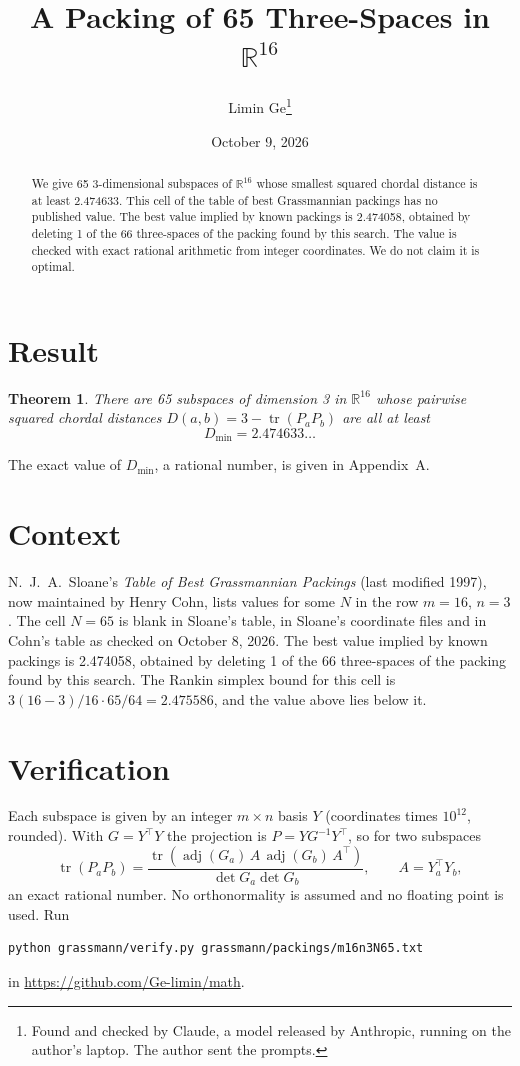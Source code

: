\documentclass[11pt,a4paper]{article}
\title{A Packing of 65 Three-Spaces in $\mathbb{R}^{16}$}
\author{Limin Ge\thanks{Found and checked by Claude, a model released by Anthropic, running on the author's laptop. The author sent the prompts.}}
\date{October 9, 2026}
\newtheorem*{theorem}{Theorem}
\begin{document}
\maketitle
\begin{abstract}
We give 65 3-dimensional subspaces of $\mathbb{R}^{16}$ whose smallest squared chordal distance is at least 2.474633. This cell of the table of best Grassmannian packings has no published value. The best value implied by known packings is 2.474058, obtained by deleting 1 of the 66 three-spaces of the packing found by this search. The value is checked with exact rational arithmetic from integer coordinates. We do not claim it is optimal.
\end{abstract}

\section{Result}
\begin{theorem}
There are 65 subspaces of dimension 3 in $\mathbb{R}^{16}$ whose pairwise squared chordal distances $D(a,b) = 3 - \operatorname{tr}(P_aP_b)$ are all at least
\[ D_{\min} = 2.474633\ldots \]
\end{theorem}
The exact value of $D_{\min}$, a rational number, is given in Appendix~A.


\section{Context}
N.~J.~A.~Sloane's \emph{Table of Best Grassmannian Packings} (last modified 1997), now maintained by Henry Cohn, lists values for some $N$ in the row $m=16$, $n=3$. The cell $N=65$ is blank in Sloane's table, in Sloane's coordinate files and in Cohn's table as checked on October 8, 2026. The best value implied by known packings is 2.474058, obtained by deleting 1 of the 66 three-spaces of the packing found by this search. The Rankin simplex bound for this cell is $3(16-3)/16\cdot 65/64 = 2.475586$, and the value above lies below it.


\section{Verification}
Each subspace is given by an integer $m\times n$ basis $Y$ (coordinates times $10^{12}$, rounded). With $G=Y^\top Y$ the projection is $P=YG^{-1}Y^\top$, so for two subspaces
\[ \operatorname{tr}(P_aP_b)=\frac{\operatorname{tr}(\operatorname{adj}(G_a)\,A\,\operatorname{adj}(G_b)\,A^\top)}{\det G_a\det G_b},\qquad A=Y_a^\top Y_b, \]
an exact rational number. No orthonormality is assumed and no floating point is used. Run
\begin{verbatim}
python grassmann/verify.py grassmann/packings/m16n3N65.txt
\end{verbatim}
in \url{https://github.com/Ge-limin/math}.
\end{document}
